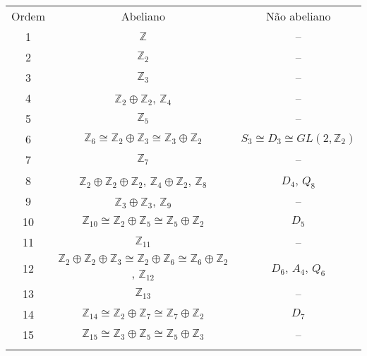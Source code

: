 	\begin{center}	
		\begin{tabular}{ccc}
			Ordem & Abeliano & Não abeliano \\
			1 & $\mathbb{Z}$ & -- \\
			2 & $\mathbb{Z}_2$ & -- \\
			3 & $\mathbb{Z}_3$ & -- \\
			4 & $\mathbb{Z}_2\oplus\mathbb{Z}_2$, $\mathbb{Z}_4$ & -- \\
			5 & $\mathbb{Z}_5$ & -- \\
			6 & $\mathbb{Z}_6\cong\mathbb{Z}_2\oplus\mathbb{Z}_3\cong\mathbb{Z}_3\oplus\mathbb{Z}_2$ & 
			$S_3\cong D_3\cong GL(2,\mathbb{Z}_2)$ \\
			7 & $\mathbb{Z}_7$ & -- \\
			8 & $\mathbb{Z}_2\oplus\mathbb{Z}_2\oplus\mathbb{Z}_2$, $\mathbb{Z}_4\oplus\mathbb{Z}_2$,
			$\mathbb{Z}_8$ & $D_4$, $Q_8$\\
			9 & $\mathbb{Z}_3\oplus\mathbb{Z}_3$, $\mathbb{Z}_9$ & -- \\
			10 & $\mathbb{Z}_{10}\cong\mathbb{Z}_2\oplus\mathbb{Z}_5\cong\mathbb{Z}_5\oplus\mathbb{Z}_2$ 
			& $D_5$ \\
			11 & $\mathbb{Z}_{11}$ & -- \\
			12 & $\mathbb{Z}_2\oplus\mathbb{Z}_2\oplus\mathbb{Z}_3\cong\mathbb{Z}_2\oplus\mathbb{Z}_6\cong\mathbb{Z}_6\oplus\mathbb{Z}_2$ , $\mathbb{Z}_{12}$ & $D_6$, $A_4$, $Q_6$ \\
			13 & $\mathbb{Z}_{13}$ & -- \\
			14 & $\mathbb{Z}_{14}\cong\mathbb{Z}_2\oplus\mathbb{Z}_7\cong\mathbb{Z}_7\oplus\mathbb{Z}_2$ & $D_7$ \\
			15 & $\mathbb{Z}_{15}\cong\mathbb{Z}_3\oplus\mathbb{Z}_5\cong\mathbb{Z}_5\oplus\mathbb{Z}_3$ & -- \\
			\label{tabela grupos}	
		\end{tabular}%
	\end{center}
